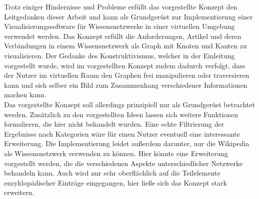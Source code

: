 \documentclass[12pt, a4paper]{article}
\begin{document}
Trotz einiger Hindernisse und Probleme erfüllt das vorgestellte Konzept den Leitgedanken dieser Arbeit und kann als Grundgerüst zur Implementierung einer Visualisierungssoftware für Wissensnetzwerke in einer virtuellen Umgebung verwendet werden. Das Konzept erfüllt die Anforderungen, Artikel und deren Verbindungen in einem Wissensnetzwerk als Graph mit Knoten und Kanten zu visualisieren. Der Gedanke des Konstruktivismus, welcher in der Einleitung vorgestellt wurde, wird im vorgestellten Konzept zudem dadurch verfolgt, dass der Nutzer im virtuellen Raum den Graphen frei manipulieren oder traversieren kann und sich selber ein Bild zum Zusammenhang verschiedener Informationen machen kann.\\

Das vorgestellte Konzept soll allerdings prinzipiell nur als Grundgerüst betrachtet werden. Zusätzlich zu den vorgestellten Ideen lassen sich weitere Funktionen formulieren, die hier nicht behandelt wurden. Eine echte Filtrierung der Ergebnisse nach Kategorien wäre für einen Nutzer eventuell eine interessante Erweiterung. Die Implementierung leidet außerdem darunter, nur die Wikipedia als Wissensnetzwerk verwenden zu können. Hier könnte eine Erweiterung vorgestellt werden, die die verschiedenen Aspekte unterschiedlicher Netzwerke behandeln kann. Auch wird nur sehr oberflächlich auf die Teilelemente enzyklopädischer Einträge eingegangen, hier ließe sich das Konzept stark erweitern.\\

\newpage


\end{document}
